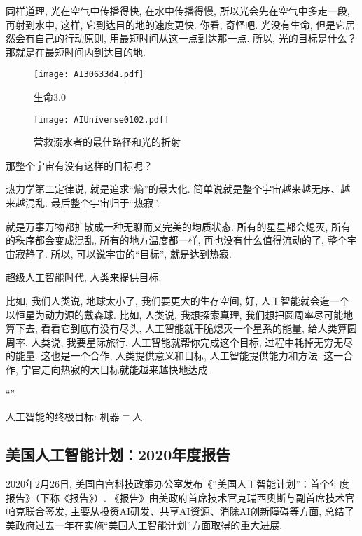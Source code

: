 同样道理, 光在空气中传播得快, 在水中传播得慢, 所以光会先在空气中多走一段, 再射到水中, 这样, 它到达目的地的速度更快.
你看, 奇怪吧. 光没有生命, 但是它居然会有自己的行动原则, 用最短时间从这一点到达那一点.
所以, 光的目标是什么？那就是在最短时间内到达目的地.
\begin{figure}[H]
\centering
\texttt{[image: AI30633d4.pdf]}
\caption{生命3.0}
\label{AI30633d4}
\end{figure}
\begin{figure}[H]
\centering
\texttt{[image: AIUniverse0102.pdf]}
\caption{营救溺水者的最佳路径和光的折射}
\label{AIUniverse0102}
\end{figure}
\begin{example}
那整个宇宙有没有这样的目标呢？
\end{example}
热力学第二定律说, 就是追求“熵”的最大化. 简单说就是整个宇宙越来越无序、越来越混乱. 最后整个宇宙归于“热寂”.
\begin{remark}
就是万事万物都扩散成一种无聊而又完美的均质状态.
所有的星星都会熄灭, 所有的秩序都会变成混乱, 所有的地方温度都一样, 再也没有什么值得流动的了, 整个宇宙寂静了.
所以, 可以说宇宙的“目标”, 就是达到热寂.
\end{remark}
\begin{example}
超级人工智能时代, 人类来提供目标.

比如, 我们人类说, 地球太小了, 我们要更大的生存空间, 好, 人工智能就会造一个以恒星为动力源的戴森球.
比如, 人类说, 我想探索真理, 我们想把圆周率尽可能地算下去, 看看它到底有没有尽头, 人工智能就干脆熄灭一个星系的能量, 给人类算圆周率.
人类说, 我要星际旅行, 人工智能就帮你完成这个目标, 过程中耗掉无穷无尽的能量.
这也是一个合作, 人类提供意义和目标, 人工智能提供能力和方法. 这一合作, 宇宙走向热寂的大目标就能越来越快地达成.
\end{example}

\begin{center}
  “”.
\end{center}
\begin{remark}
  人工智能的终极目标: 机器$\equiv$人.
\end{remark}
\subsection{美国人工智能计划：2020年度报告}
2020年2月26日, 美国白宫科技政策办公室发布《“美国人工智能计划”：首个年度报告》（下称《报告》）. 《报告》由美政府首席技术官克瑞西奥斯与副首席技术官帕克联合签发, 主要从投资AI研发、共享AI资源、消除AI创新障碍等方面, 总结了美政府过去一年在实施“美国人工智能计划”方面取得的重大进展.

